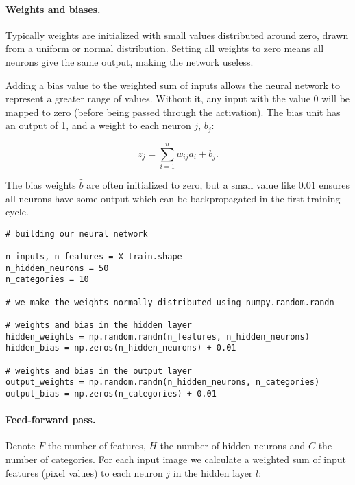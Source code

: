 \paragraph{Weights and biases.}
Typically weights are initialized with small values distributed around zero, drawn from a uniform
or normal distribution. Setting all weights to zero means all neurons give the same output, making the network useless.  

Adding a bias value to the weighted sum of inputs allows the neural network to represent a greater range
of values. Without it, any input with the value 0 will be mapped to zero (before being passed through the activation). The bias unit has an output of 1, and a weight to each neuron $j$, $b_j$:  

$$ z_j = \sum_{i=1}^n w_ {ij} a_i + b_j.$$  

The bias weights $\hat{b}$ are often initialized to zero, but a small value like $0.01$ ensures all neurons have some output which can be backpropagated in the first training cycle.
















\begin{verbatim}
# building our neural network

n_inputs, n_features = X_train.shape
n_hidden_neurons = 50
n_categories = 10

# we make the weights normally distributed using numpy.random.randn

# weights and bias in the hidden layer
hidden_weights = np.random.randn(n_features, n_hidden_neurons)
hidden_bias = np.zeros(n_hidden_neurons) + 0.01

# weights and bias in the output layer
output_weights = np.random.randn(n_hidden_neurons, n_categories)
output_bias = np.zeros(n_categories) + 0.01

\end{verbatim}


\paragraph{Feed-forward pass.}
Denote $F$ the number of features, $H$ the number of hidden neurons and $C$ the number of categories.  
For each input image we calculate a weighted sum of input features (pixel values) to each neuron $j$ in the hidden layer $l$:  


